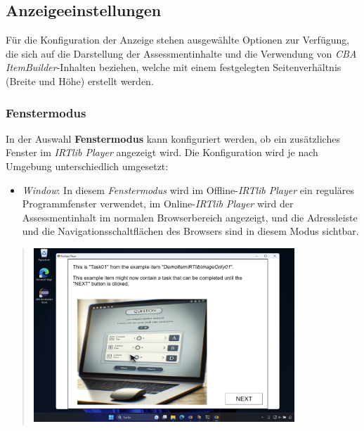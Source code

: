 \documentclass[
  letterpaper,
  DIV=11]{scrreprt}
\providecommand{\tightlist}{%
  \setlength{\itemsep}{0pt}\setlength{\parskip}{0pt}}\usepackage{longtable,booktabs,array}
\begin{document}
\begin{tcolorbox}[enhanced jigsaw, colbacktitle=quarto-callout-tip-color!10!white, coltitle=black, colframe=quarto-callout-tip-color-frame, leftrule=.75mm, breakable, opacitybacktitle=0.6, toprule=.15mm, title=\textcolor{quarto-callout-tip-color}{\faLightbulb}\hspace{0.5em}{Eingebettete Programmhilfe}, colback=white, titlerule=0mm, arc=.35mm, bottomtitle=1mm, toptitle=1mm, rightrule=.15mm, bottomrule=.15mm, left=2mm, opacityback=0]

\hypertarget{anzeigeeinstellungen-1}{%
\subsection{Anzeigeeinstellungen}\label{anzeigeeinstellungen-1}}

Für die Konfiguration der Anzeige stehen ausgewählte Optionen zur
Verfügung, die sich auf die Darstellung der Assessmentinhalte und die
Verwendung von \emph{CBA ItemBuilder}-Inhalten beziehen, welche mit
einem festgelegten Seitenverhältnis (Breite und Höhe) erstellt werden.

\hypertarget{fenstermodus-1}{%
\subsubsection{Fenstermodus}\label{fenstermodus-1}}

In der Auswahl \textbf{Fenstermodus} kann konfiguriert werden, ob ein
zusätzliches Fenster im \emph{IRTlib Player} angezeigt wird. Die
Konfiguration wird je nach Umgebung unterschiedlich umgesetzt:

\begin{itemize}
\tightlist
\item
  \emph{Window}: In diesem \emph{Fenstermodus} wird im
  Offline-\emph{IRTlib Player} ein reguläres Programmfenster verwendet,
  im Online-\emph{IRTlib Player} wird der Assessmentinhalt im normalen
  Browserbereich angezeigt, und die Adressleiste und die
  Navigationsschaltflächen des Browsers sind in diesem Modus sichtbar.
\end{itemize}

\begin{quote}
\includegraphics[width=0.8\textwidth,height=\textheight]{img/screenshot-window-mode-example-offline-player-01.png}
\end{quote}


\end{tcolorbox}
\end{document}
